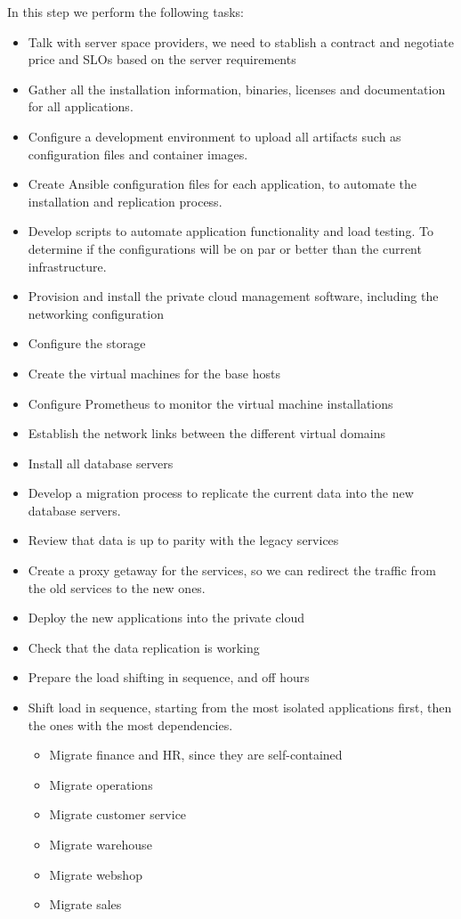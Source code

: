 \documentclass{llncs}
\begin{document}
In this step we perform the following tasks:
\begin{itemize}

  \item  Talk with server space providers, we need to stablish a contract and negotiate price and SLOs based on the server requirements
  \item Gather all the installation information, binaries, licenses and documentation for all applications.
  \item Configure a development environment to upload all artifacts such as configuration files and container images.
  \item Create Ansible configuration files for each application, to automate the installation and replication process.
  \item Develop scripts to automate application functionality and load testing. To determine if the configurations will be on par or better than the current infrastructure.
  \item  Provision and install the private cloud management software, including the networking configuration
  \item  Configure the storage
  \item Create the virtual machines for the base hosts
  \item Configure Prometheus to monitor the virtual machine installations
  \item Establish the network links between the different virtual domains
  \item Install all database servers
  \item Develop a migration process to replicate the current data into the new database servers.
  \item Review that data is up to parity with the legacy services
  \item Create a proxy getaway for the services, so we can redirect the traffic from the old services to the new ones.
  \item Deploy the new applications into the private cloud
  \item Check that the data replication is working
  \item Prepare the load shifting in sequence, and off hours
  \item Shift load in sequence, starting from the most isolated applications first, then the ones with the most dependencies.
        \begin{itemize}
          \item Migrate finance and HR, since they are self-contained
          \item Migrate operations
          \item Migrate customer service
          \item Migrate warehouse
          \item Migrate webshop
          \item Migrate sales
        \end{itemize}
\end{itemize}
\end{document}
